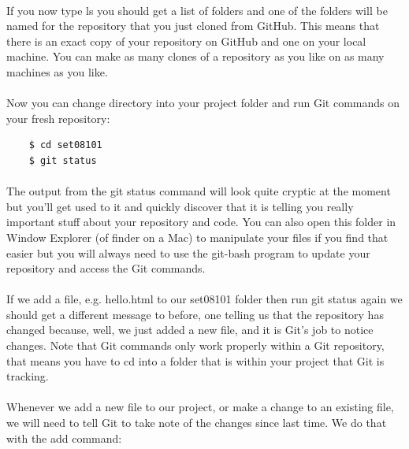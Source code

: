 \documentclass[10pt, a4paper, twosize]{article}
\begin{document}
\paragraph{} If you now type ls you should get a list of folders and one of the folders will be named for the repository that you just cloned from GitHub. This means that there is an exact copy of your repository on GitHub and one on your local machine. You can make as many clones of a repository as you like on as many machines as you like.

\paragraph{} Now you can change directory into your project folder and run Git commands on your fresh repository:

\begin{lstlisting}
    $ cd set08101
    $ git status
\end{lstlisting}

\paragraph{} The output from the git status command will look quite cryptic at the moment but you'll get used to it and quickly discover that it is telling you really important stuff about your repository and code. You can also open this folder in Window Explorer (of finder on a Mac) to manipulate your files if you find that easier but you will always need to use the git-bash program to update your repository and access the Git commands.

\paragraph{} If we add a file, e.g. hello.html to our set08101 folder then run git status again we should get a different message to before, one telling us that the repository has changed because, well, we just added a new file, and it is Git's job to notice changes. Note that Git commands only work properly within a Git repository, that means you have to cd into a folder that is within your project that Git is tracking.

\paragraph{} Whenever we add a new file to our project, or make a change to an existing file, we will need to tell Git to take note of the changes since last time. We do that with the add command:
\end{document}
